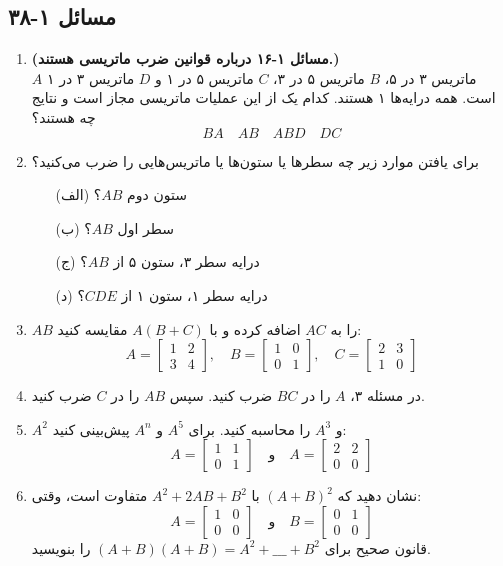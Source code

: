 \documentclass[12pt, a4paper]{book}
\begin{document}
	\subsection*{مسائل ۱-۳۸}
	\begin{enumerate}
		\item \textbf{(مسائل ۱-۱۶ درباره قوانین ضرب ماتریسی هستند.)} \\
		$A$ ماتریس ۳ در ۵، $B$ ماتریس ۵ در ۳، $C$ ماتریس ۵ در ۱ و $D$ ماتریس ۳ در ۱ است. همه درایه‌ها ۱ هستند. کدام یک از این عملیات ماتریسی مجاز است و نتایج چه هستند؟
		\[ BA \quad AB \quad ABD \quad DC \]
		
		\item برای یافتن موارد زیر چه سطرها یا ستون‌ها یا ماتریس‌هایی را ضرب می‌کنید؟
		\begin{itemize}
			\item[(الف)] ستون دوم $AB$؟
			\item[(ب)] سطر اول $AB$؟
			\item[(ج)] درایه سطر ۳، ستون ۵ از $AB$؟
			\item[(د)] درایه سطر ۱، ستون ۱ از $CDE$؟
		\end{itemize}
		
		\item $AB$ را به $AC$ اضافه کرده و با $A(B+C)$ مقایسه کنید:
		\[ A = \begin{bmatrix} 1 & 2 \\ 3 & 4 \end{bmatrix}, \quad B = \begin{bmatrix} 1 & 0 \\ 0 & 1 \end{bmatrix}, \quad C = \begin{bmatrix} 2 & 3 \\ 1 & 0 \end{bmatrix} \]
		
		\item در مسئله ۳، $A$ را در $BC$ ضرب کنید. سپس $AB$ را در $C$ ضرب کنید.
		
		\item $A^2$ و $A^3$ را محاسبه کنید. برای $A^5$ و $A^n$ پیش‌بینی کنید:
		\[ A = \begin{bmatrix} 1 & 1 \\ 0 & 1 \end{bmatrix} \quad \text{و} \quad A = \begin{bmatrix} 2 & 2 \\ 0 & 0 \end{bmatrix} \]
		
		\item نشان دهید که $(A+B)^2$ با $A^2+2AB+B^2$ متفاوت است، وقتی:
		\[ A = \begin{bmatrix} 1 & 0 \\ 0 & 0 \end{bmatrix} \quad \text{و} \quad B = \begin{bmatrix} 0 & 1 \\ 0 & 0 \end{bmatrix} \]
		قانون صحیح برای $(A+B)(A+B) = A^2 + \_\_\_ + B^2$ را بنویسید.
		

\end{enumerate}
\end{document}
